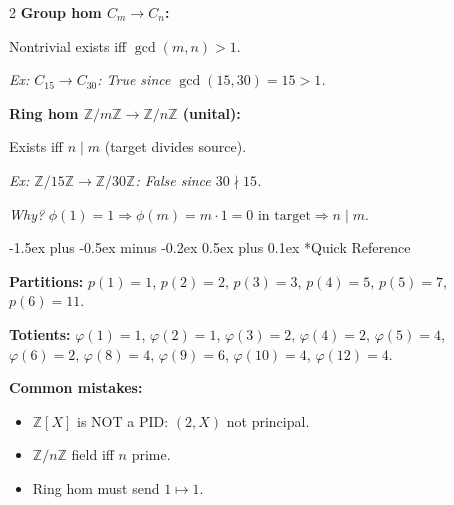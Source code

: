 \documentclass[8pt,a4paper]{extarticle}
\makeatletter
\newcommand{\Z}{\mathbb{Z}}
\renewcommand\subsection{\@startsection{subsection}{2}{\z@}%
  {-1.5ex plus -0.5ex minus -0.2ex}%
  {0.5ex plus 0.1ex}%
  {\normalfont\normalsize\bfseries}}
\makeatother
\begin{document}
\begin{multicols}{2}
\textbf{Group hom $C_m \to C_n$:}

Nontrivial exists iff $\gcd(m,n) > 1$.

\textit{Ex: $C_{15} \to C_{30}$: True since $\gcd(15,30)=15 > 1$.}

\textbf{Ring hom $\Z/m\Z \to \Z/n\Z$ (unital):}

Exists iff $n \mid m$ (target divides source).

\textit{Ex: $\Z/15\Z \to \Z/30\Z$: False since $30 \nmid 15$.}

\textit{Why?} $\phi(1) = 1 \Rightarrow \phi(m) = m \cdot 1 = 0 \text{ in target} \Rightarrow n \mid m$.

\subsection*{Quick Reference}

\textbf{Partitions:} $p(1)=1$, $p(2)=2$, $p(3)=3$, $p(4)=5$, $p(5)=7$, $p(6)=11$.

\textbf{Totients:} $\varphi(1)=1$, $\varphi(2)=1$, $\varphi(3)=2$, $\varphi(4)=2$, $\varphi(5)=4$, $\varphi(6)=2$, $\varphi(8)=4$, $\varphi(9)=6$, $\varphi(10)=4$, $\varphi(12)=4$.

\textbf{Common mistakes:}
\begin{itemize}[leftmargin=*, itemsep=0pt, topsep=2pt]
\item $\Z[X]$ is NOT a PID: $(2, X)$ not principal.
\item $\Z/n\Z$ field iff $n$ prime.
\item Ring hom must send $1 \mapsto 1$.
\end{itemize}

\end{multicols}
\end{document}
